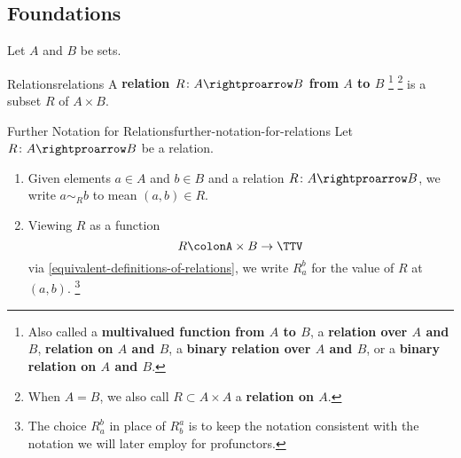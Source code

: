 \subsection{Foundations}\label{subsection-relations-foundations}
Let $A$ and $B$ be sets.
\begin{definition}{Relations}{relations}%
    A \textbf{relation $R\colon A\rightproarrow B$ from $A$ to $B$}%
    \footnote{%
        Also called a \textbf{multivalued function from $A$ to $B$}, a \textbf{relation over $A$ and $B$}, \textbf{relation on $A$ and $B$}, a \textbf{binary relation over $A$ and $B$}, or a \textbf{binary relation on $A$ and $B$}.
    }%
    \footnote{%
        When $A=B$, we also call $R\subset A\times A$ a \textbf{relation on $A$}.
        \par\vspace*{-1.75\baselineskip}
    } %
    is a subset $R$ of $A\times B$.%
\end{definition}
\begin{notation}{Further Notation for Relations}{further-notation-for-relations}%
    Let $R\colon A\rightproarrow B$ be a relation.
    \begin{enumerate}
        \item\label{further-notation-for-relations-1}Given elements $a\in A$ and $b\in B$ and a relation $R\colon A\rightproarrow B$, we write $a\sim_{R}b$ to mean $(a,b)\in R$.
        \item\label{further-notation-for-relations-2}Viewing $R$ as a function
            \[
                R%
                \colon%
                A\times B%
                \to%
                \TTV%
            \]%
            via \cref{equivalent-definitions-of-relations}, we write $R^{b}_{a}$ for the value of $R$ at $(a,b)$.%
            \footnote{%
                The choice $R^{b}_{a}$ in place of $R^{a}_{b}$ is to keep the notation consistent with the notation we will later employ for profunctors.
                \par\vspace*{-1.75\baselineskip}
            }%
    \end{enumerate}
\end{notation}

